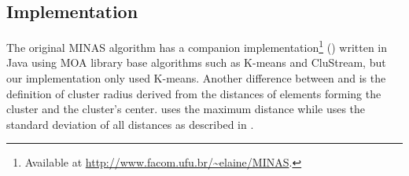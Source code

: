 



\subsection{Implementation}\label{sec:implementation}

The original MINAS algorithm has a companion implementation\footnote{Available
at \url{http://www.facom.ufu.br/~elaine/MINAS}.} () written in Java
using MOA library base algorithms such as K-means and CluStream, but our
implementation only used K-means.
Another difference between  and \mfog is the definition of cluster radius
derived from the distances of elements forming the cluster and the cluster's center.
 uses the maximum distance while \mfog uses the standard deviation
of all distances as described in \cite{Faria2016minas}.


